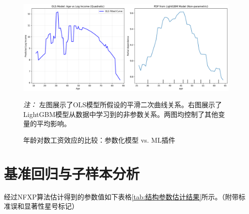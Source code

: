 \documentclass[master, final]{zufe-thesis}
\begin{document}
\begin{figure}[!ht]
\centering
\includegraphics[width=\textwidth]{../results/ml_comparison/age_partial_dependence_plot.png}
\caption{年龄对数工资效应的比较：参数化模型 vs. ML插件}
\label{fig:pdp_comparison}
\vspace{1em}
\begin{minipage}{\linewidth}
\small
\textit{注：} 左图展示了OLS模型所假设的平滑二次曲线关系。右图展示了LightGBM模型从数据中学习到的非参数关系。两图均控制了其他变量的平均影响。
\end{minipage}
\end{figure}




\section{基准回归与子样本分析} %



经过NFXP算法估计得到的参数值如下表格\ref{tab:结构参数估计结果}所示。（附带标准误和显著性星号标记）


\end{document}
